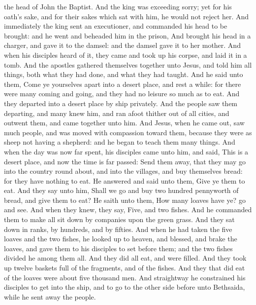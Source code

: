 the head of John the Baptist.  And the king was exceeding
sorry; yet for his oath's sake, and for their sakes which sat with him,
he would not reject her.  And immediately the king sent an
executioner, and commanded his head to be brought: and he went and
beheaded him in the prison,  And brought his head in a
charger, and gave it to the damsel: and the damsel gave it to her
mother.  And when his disciples heard of it, they came and
took up his corpse, and laid it in a tomb.  And the
apostles gathered themselves together unto Jesus, and told him all
things, both what they had done, and what they had taught. 
And he said unto them, Come ye yourselves apart into a desert place, and
rest a while: for there were many coming and going, and they had no
leisure so much as to eat.  And they departed into a desert
place by ship privately.  And the people saw them
departing, and many knew him, and ran afoot thither out of all cities,
and outwent them, and came together unto him.  And Jesus,
when he came out, saw much people, and was moved with compassion toward
them, because they were as sheep not having a shepherd: and he began to
teach them many things.  And when the day was now far
spent, his disciples came unto him, and said, This is a desert place,
and now the time is far passed:  Send them away, that they
may go into the country round about, and into the villages, and buy
themselves bread: for they have nothing to eat.  He
answered and said unto them, Give ye them to eat. And they say unto him,
Shall we go and buy two hundred pennyworth of bread, and give them to
eat?  He saith unto them, How many loaves have ye? go and
see. And when they knew, they say, Five, and two fishes. 
And he commanded them to make all sit down by companies upon the green
grass.  And they sat down in ranks, by hundreds, and by
fifties.  And when he had taken the five loaves and the two
fishes, he looked up to heaven, and blessed, and brake the loaves, and
gave them to his disciples to set before them; and the two fishes
divided he among them all.  And they did all eat, and were
filled.  And they took up twelve baskets full of the
fragments, and of the fishes.  And they that did eat of the
loaves were about five thousand men.  And straightway he
constrained his disciples to get into the ship, and to go to the other
side before unto Bethsaida, while he sent away the people. 
